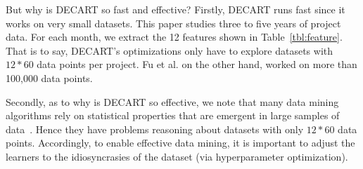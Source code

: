 \documentclass[sigconf,anonymous,review]{acmart}
\begin{document}
But why is DECART so fast and effective?
Firstly,  DECART runs fast since it works on   very small datasets. 
This paper studies three to five years of project data. For each month, we  extract the 12 features shown in  Table~\ref{tbl:feature}. That is to say,  DECART's optimizations only have to explore datasets with  $\mathit{12*60}$
 data points per project.
  Fu et al. on the other hand, worked on more than 100,000 data points.
 
 
Secondly, as to why is DECART so effective, we note that many data mining algorithms  rely on  statistical properties that are emergent in   large samples of data~\cite{witten11}. Hence they  
have problems reasoning about  datasets with only $\mathit{12*60}$ data points.  
Accordingly, to enable effective data mining,
it is important to adjust the learners to the   idiosyncrasies of the dataset 
(via hyperparameter optimization).
 
\end{document}
